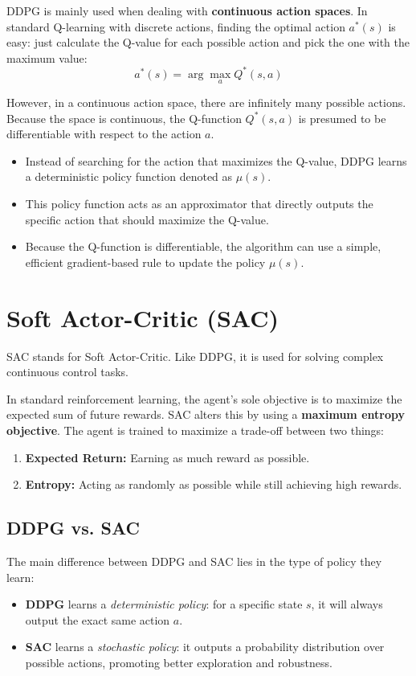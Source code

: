 \documentclass[12pt]{article}
\begin{document}
DDPG is mainly used when dealing with \textbf{continuous action spaces}. In standard Q-learning with discrete actions, finding the optimal action $a^*(s)$ is easy: just calculate the Q-value for each possible action and pick the one with the maximum value:
\[ a^*(s) = \arg\max_a Q^*(s, a) \]

However, in a continuous action space, there are infinitely many possible actions. Because the space is continuous, the Q-function $Q^*(s, a)$ is presumed to be differentiable with respect to the action $a$.
\begin{itemize}
    \item Instead of searching for the action that maximizes the Q-value, DDPG learns a deterministic policy function denoted as $\mu(s)$.
    \item This policy function acts as an approximator that directly outputs the specific action that should maximize the Q-value.
    \item Because the Q-function is differentiable, the algorithm can use a simple, efficient gradient-based rule to update the policy $\mu(s)$.
\end{itemize}


\section{Soft Actor-Critic (SAC)}

SAC stands for Soft Actor-Critic. Like DDPG, it is used for solving complex continuous control tasks. 

In standard reinforcement learning, the agent's sole objective is to maximize the expected sum of future rewards. SAC alters this by using a \textbf{maximum entropy objective}. The agent is trained to maximize a trade-off between two things:
\begin{enumerate}
    \item \textbf{Expected Return:} Earning as much reward as possible.
    \item \textbf{Entropy:} Acting as randomly as possible while still achieving high rewards.
\end{enumerate}

\subsection{DDPG vs. SAC}
The main difference between DDPG and SAC lies in the type of policy they learn:
\begin{itemize}
    \item \textbf{DDPG} learns a \textit{deterministic policy}: for a specific state $s$, it will always output the exact same action $a$.
    \item \textbf{SAC} learns a \textit{stochastic policy}: it outputs a probability distribution over possible actions, promoting better exploration and robustness.
\end{itemize}
\end{document}
